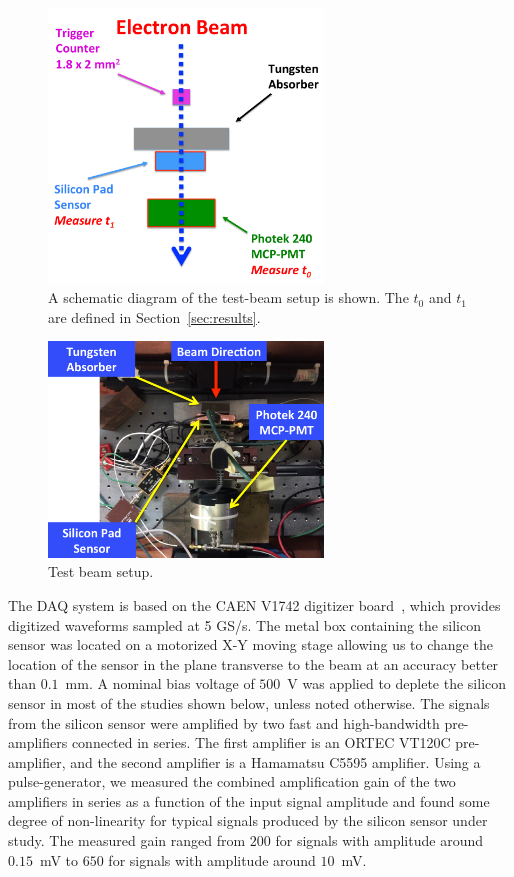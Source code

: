 \documentclass[12pt]{article}
\begin{document}
{\begin{figure}[htbp] 
\centering
\includegraphics[width=0.65\textwidth]{plots/BeamSchematicDiagram.pdf} 
\caption{A schematic diagram of the test-beam setup is shown. The $t_0$ and $t_1$ are defined in Section~\ref{sec:results}.} 
\label{fig:BeamSchematicDiagram} 
\end{figure} 

\begin{figure}[htbp] 
\centering
\includegraphics[width=0.65\textwidth]{plots/BeamPhotoDiagram.pdf} 
\caption{Test beam setup.} 
\label{fig:BeamPhotoDiagram} 
\end{figure} 

The DAQ system is based on the CAEN V1742 digitizer board~\cite{CAENDRS}, which
provides digitized waveforms sampled at 5 GS/s. The metal box containing the
silicon sensor was located on a motorized X-Y moving stage allowing us to change
the location of the sensor in the plane transverse to the beam at an accuracy
better than $0.1$~mm. A nominal bias voltage of $500$~V was applied to deplete
the silicon sensor in most of the studies shown below, unless noted otherwise.
The signals from the silicon sensor were amplified by two fast and
high-bandwidth pre-amplifiers connected in series. The first amplifier is an
ORTEC VT120C pre-amplifier, and the second amplifier is a Hamamatsu C5595
amplifier. Using a pulse-generator, we measured the combined amplification gain
of the two amplifiers in series as a function of the input signal amplitude and
found some degree of non-linearity for typical signals produced by the silicon
sensor under study. The measured gain ranged from $200$ for signals with
amplitude around $0.15$~mV to $650$ for signals with amplitude around $10$~mV.

}
\end{document}

